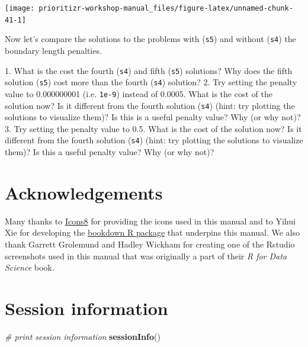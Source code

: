 \documentclass[12pt,]{book}
\makeatletter
\newenvironment{Shaded}{\begin{snugshade}}{\end{snugshade}}
\newcommand{\KeywordTok}[1]{\textcolor[rgb]{0.13,0.29,0.53}{\textbf{#1}}}
\newcommand{\CommentTok}[1]{\textcolor[rgb]{0.56,0.35,0.01}{\textit{#1}}}
\newcommand{\NormalTok}[1]{#1}
\newenvironment{kframe}{%
\medskip{}
\setlength{\fboxsep}{.8em}
 \def\at@end@of@kframe{}%
 \ifinner\ifhmode%
  \def\at@end@of@kframe{\end{minipage}}%
  \begin{minipage}{\columnwidth}%
 \fi\fi%
 \def\FrameCommand##1{\hskip\@totalleftmargin \hskip-\fboxsep
 \colorbox{shadecolor}{##1}\hskip-\fboxsep
     \hskip-\linewidth \hskip-\@totalleftmargin \hskip\columnwidth}%
 \MakeFramed {\advance\hsize-\width
   \@totalleftmargin\z@ \linewidth\hsize
   \@setminipage}}%
 {\par\unskip\endMakeFramed%
 \at@end@of@kframe}
\newenvironment{rmdblock}[1]
  {
  \begin{itemize}
  \renewcommand{\labelitemi}{
    \raisebox{-.7\height}[0pt][0pt]{
      {\setkeys{Gin}{width=3em,keepaspectratio}\texttt{[image: images/\#1]}}
    }
  }
  \setlength{\fboxsep}{1em}
  \begin{kframe}
  \item
  }
  {
  \end{kframe}
  \end{itemize}
  }
\newenvironment{rmdquestion}
  {\begin{rmdblock}{question}}
  {\end{rmdblock}}
\makeatother
\begin{document}
\begin{center}\texttt{[image: prioritizr-workshop-manual\_files/figure-latex/unnamed-chunk-41-1]} \end{center}

Now let's compare the solutions to the problems with (\texttt{s5}) and
without (\texttt{s4}) the boundary length penalties.

\begin{rmdquestion} 1. What is the cost the fourth
(\texttt{s4}) and fifth (\texttt{s5}) solutions? Why does the fifth
solution (\texttt{s5}) cost more than the fourth (\texttt{s4}) solution?
2. Try setting the penalty value to 0.000000001 (i.e. \texttt{1e-9})
instead of 0.0005. What is the cost of the solution now? Is it different
from the fourth solution (\texttt{s4}) (hint: try plotting the solutions
to visualize them)? Is this is a useful penalty value? Why (or why not)?
3. Try setting the penalty value to 0.5. What is the cost of the
solution now? Is it different from the fourth solution (\texttt{s4})
(hint: try plotting the solutions to visualize them)? Is this a useful
penalty value? Why (or why not)?
\end{rmdquestion}

\chapter{Acknowledgements}\label{acknowledgements}

Many thanks to \href{https://icons8.com}{Icons8} for providing the icons
used in this manual and to Yihui Xie for developing the
\href{http://bookdown.org}{bookdown R package} that underpins this
manual. We also thank Garrett Grolemund and Hadley Wickham for creating
one of the Rstudio screenshots used in this manual that was originally a
part of their \emph{R for Data Science} book.

\chapter{Session information}\label{session-information}

\begin{Shaded}
\begin{Highlighting}[]
\CommentTok{# print session information}
\KeywordTok{sessionInfo}\NormalTok{()}
\end{Highlighting}
\end{Shaded}
\end{document}
